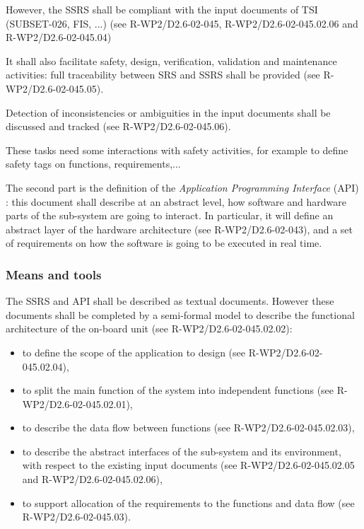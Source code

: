 However, the SSRS shall be compliant with the input documents of TSI (SUBSET-026, FIS, ...) (see R-WP2/D2.6-02-045, R-WP2/D2.6-02-045.02.06 and R-WP2/D2.6-02-045.04)

It shall also facilitate safety, design, verification, validation and maintenance activities: full traceability between SRS and SSRS shall be provided (see R-WP2/D2.6-02-045.05).

Detection of inconsistencies or ambiguities in the input documents shall be discussed and tracked (see R-WP2/D2.6-02-045.06).

These tasks need some interactions with safety activities, for example to define safety tags on functions, requirements,...

The second part is the definition of the \textit{Application Programming Interface} (API) : this document shall describe at an abstract level, how software and hardware parts of the sub-system are going to interact.
In particular, it will define an abstract layer of the hardware architecture (see R-WP2/D2.6-02-043), and a set of requirements on how the software is going to be executed in real time.

\subsubsection{Means and tools}

The SSRS and API shall be described as textual documents.
However these documents shall be completed by a semi-formal model to describe the functional architecture of the on-board unit (see R-WP2/D2.6-02-045.02.02):

\begin{itemize}
\item to  define the scope of the application to design (see R-WP2/D2.6-02-045.02.04),
\item to split the main function of the system into independent functions (see R-WP2/D2.6-02-045.02.01),
\item to describe the data flow between functions (see R-WP2/D2.6-02-045.02.03),
\item to describe the abstract interfaces of the sub-system and its environment, with respect to the existing input documents (see R-WP2/D2.6-02-045.02.05 and R-WP2/D2.6-02-045.02.06),
\item to  support allocation of the requirements to  the functions and data flow (see R-WP2/D2.6-02-045.03).
\end{itemize}

